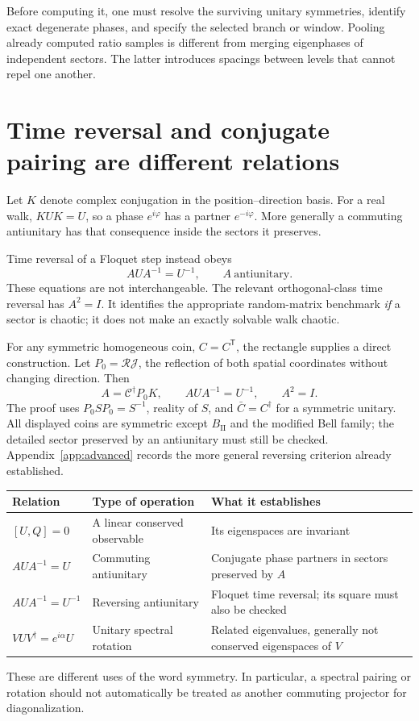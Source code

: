\documentclass[11pt,a4paper,oneside]{report}
\newcommand{\CC}{\mathcal C}
\newcommand{\Id}{I}
\numberwithin{equation}{chapter}
\begin{document}
Before computing it, one must resolve the surviving unitary symmetries,
identify exact degenerate phases, and specify the selected branch or
window. Pooling already computed ratio samples is different from
merging eigenphases of independent sectors. The latter introduces
spacings between levels that cannot repel one another.

\section{Time reversal and conjugate pairing are different relations}
\label{sec:TR}

Let \(K\) denote complex conjugation in the position--direction basis.
For a real walk, \(KUK=U\), so a phase \(e^{i\varphi}\) has a
partner \(e^{-i\varphi}\). More generally a commuting antiunitary
has that consequence inside the sectors it preserves.

Time reversal of a Floquet step instead obeys
\begin{equation}
AUA^{-1}=U^{-1},\qquad A\ \text{antiunitary}.
\label{eq:TR}
\end{equation}
These equations are not interchangeable. The relevant orthogonal-class
time reversal has \(A^2=\Id\). It identifies the appropriate
random-matrix benchmark \emph{if} a sector is chaotic; it does not
make an exactly solvable walk chaotic.

For any symmetric homogeneous coin, \(C=C^{\mathsf T}\), the
rectangle supplies a direct construction. Let
\(P_0=\mathcal R\mathcal J\), the reflection of both spatial
coordinates without changing direction. Then
\begin{equation}
\boxed{A=\CC^\dagger P_0K,\qquad AUA^{-1}=U^{-1},\qquad A^2=\Id.}
\end{equation}
The proof uses \(P_0SP_0=S^{-1}\), reality of \(S\), and
\(\bar C=C^\dagger\) for a symmetric unitary. All displayed coins are symmetric except \(B_{\mathrm{II}}\) and the
modified Bell family; the detailed sector preserved by an antiunitary
must still be checked. Appendix~\ref{app:advanced}
records the more general reversing criterion already established.

\begin{center}\small
\begin{tabularx}{\textwidth}{@{}lYY@{}}\toprule
Relation & Type of operation & What it establishes\\\midrule
\([U,Q]=0\) & A linear conserved observable & Its eigenspaces are invariant\\
\(AUA^{-1}=U\) & Commuting antiunitary & Conjugate phase partners in sectors preserved by \(A\)\\
\(AUA^{-1}=U^{-1}\) & Reversing antiunitary & Floquet time reversal; its square must also be checked\\
\(VUV^\dagger=e^{i\alpha}U\) & Unitary spectral rotation & Related eigenvalues, generally not conserved eigenspaces of \(V\)\\\bottomrule
\end{tabularx}
\end{center}
These are different uses of the word symmetry. In particular, a
spectral pairing or rotation should not automatically be treated as
another commuting projector for diagonalization.
\end{document}

